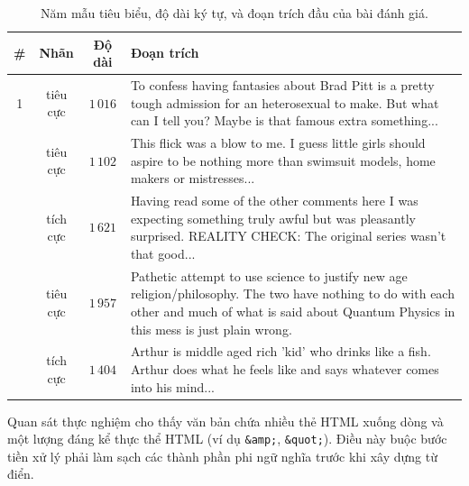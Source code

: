 \begin{table}[htbp]
\centering
\caption{Năm mẫu tiêu biểu, độ dài ký tự, và đoạn trích đầu của bài đánh giá.}
\label{tab:mau-tieu-bieu}
\begin{tabularx}{\textwidth}{cccX} %
\toprule
\textbf{\#} & \textbf{Nhãn} & \textbf{Độ dài} & \textbf{Đoạn trích} \\ \midrule
1 & tiêu cực & $1\,016$ & To confess having fantasies about Brad Pitt is a pretty tough admission for an heterosexual to make. But what can I tell you? Maybe is that famous extra something... \\ \addlinespace
2 & tiêu cực & $1\,102$ & This flick was a blow to me. I guess little girls should aspire to be nothing more than swimsuit models, home makers or mistresses... \\ \addlinespace
3 & tích cực & $1\,621$ & Having read some of the other comments here I was expecting something truly awful but was pleasantly surprised. REALITY CHECK: The original series wasn't that good... \\ \addlinespace
4 & tiêu cực & $1\,957$ & Pathetic attempt to use science to justify new age religion/philosophy. The two have nothing to do with each other and much of what is said about Quantum Physics in this mess is just plain wrong. \\ \addlinespace
5 & tích cực & $1\,404$ & Arthur is middle aged rich 'kid' who drinks like a fish. Arthur does what he feels like and says whatever comes into his mind... \\ \bottomrule
\end{tabularx}
\end{table}

Quan sát thực nghiệm cho thấy văn bản chứa nhiều thẻ HTML xuống dòng và một lượng đáng kể thực thể HTML (ví dụ \texttt{\&amp;}, \texttt{\&quot;}). Điều này buộc bước tiền xử lý phải làm sạch các thành phần phi ngữ nghĩa trước khi xây dựng từ điển.